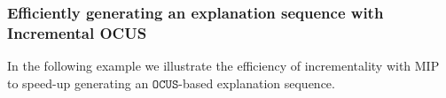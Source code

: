 \documentclass[twoside,11pt]{article}
\newcommand\m[1]{\mathcal{#1}}
\newcommand\comment[1]{\marginpar{\tiny #1}}
\renewcommand\comment[1]{#1}
\newcommand{\tias}[1]{{\comment{\color{blue}Tias:#1}}}
\newcommand\setstohit{\ensuremath{\m{H} }\xspace}
\newcommand\mm[1]{\ensuremath{#1}\xspace}
\newcommand\call[1]{\mm{\texttt{#1}}}
\newcommand\omus{\mm{\call{OUS}}}
\newcommand\comus{\mm{\call{OCUS}}}
\newcommand\ousb{\mm{\call{OCUS\_Bound}}}
\begin{document}


\subsubsection{Efficiently generating an explanation sequence with Incremental OCUS} \label{sec:ocus-incr}
In the following example we illustrate the efficiency of incrementality with MIP to speed-up 
generating an \comus-based explanation sequence.
\end{document}
